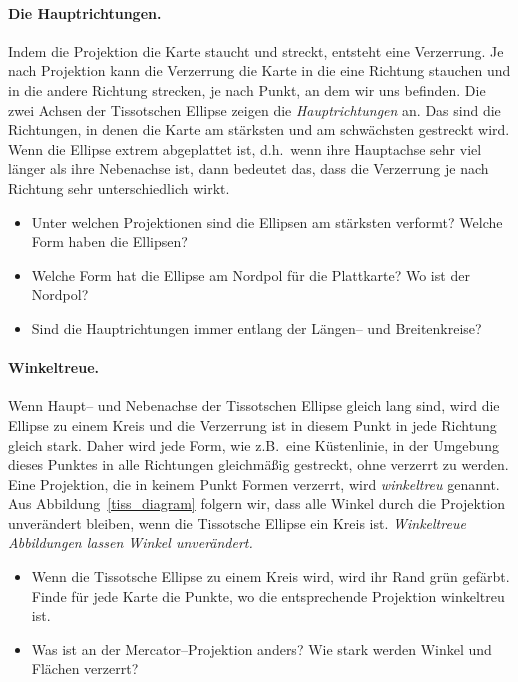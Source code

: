 \documentclass[a4paper,12pt]{article}
\begin{document}
\paragraph{Die Hauptrichtungen.}
Indem die Projektion die Karte staucht und streckt, entsteht eine Verzerrung. Je nach 
Projektion kann die Verzerrung die Karte in die eine Richtung stauchen und in die andere 
Richtung strecken, je nach Punkt, an dem wir uns befinden. Die zwei Achsen der Tissotschen
Ellipse zeigen die \emph{Hauptrichtungen} an. Das sind die Richtungen, in denen 
die Karte am stärksten und am schwächsten gestreckt wird. Wenn die Ellipse extrem  
abgeplattet ist, d.h.\ wenn ihre Hauptachse sehr viel länger als ihre Nebenachse ist,
dann bedeutet das, dass die Verzerrung je nach Richtung sehr unterschiedlich wirkt.

\begin{itemize}
 \item Unter welchen Projektionen sind die Ellipsen am stärksten verformt? Welche Form 
       haben die Ellipsen?
 \item Welche Form hat die Ellipse am Nordpol für die Plattkarte? Wo ist der Nordpol?
 \item Sind die Hauptrichtungen immer entlang der Längen-- und Breitenkreise?
\end{itemize}



\paragraph{Winkeltreue.} 
Wenn Haupt-- und Nebenachse der Tissotschen Ellipse gleich lang sind, wird die Ellipse 
zu einem Kreis und die Verzerrung ist in diesem Punkt in jede Richtung gleich stark.
Daher wird jede Form, wie z.B.\ eine Küstenlinie, in der Umgebung dieses Punktes in 
alle Richtungen gleichmäßig gestreckt, ohne verzerrt zu werden. Eine Projektion, die 
in keinem Punkt Formen verzerrt, wird \emph{winkeltreu} genannt. Aus 
Abbildung~\ref{tiss_diagram} folgern wir, dass alle Winkel durch die Projektion 
unverändert bleiben, wenn die Tissotsche Ellipse ein Kreis ist.
\emph{Winkeltreue Abbildungen lassen Winkel unverändert.}

\begin{itemize}
 \item Wenn die Tissotsche Ellipse zu einem Kreis wird, wird ihr Rand grün gefärbt.
       Finde für jede Karte die Punkte, wo die entsprechende Projektion winkeltreu 
       ist.
 \item Was ist an der Mercator--Projektion anders? Wie stark werden Winkel und Flächen 
       verzerrt?
\end{itemize}
\end{document}
